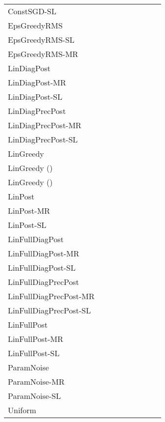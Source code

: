 \documentclass{article} \usepackage{iclr2018_conference,times}
\begin{document}
\begin{landscape}
\begin{table}[ht]
\begin{adjustbox}{center}
\begin{tabular}{lllllllll}
ConstSGD-SL & & & \bm{}& & & & &  \\
EpsGreedyRMS & & & & & & & &  \\
EpsGreedyRMS-SL & & & & & & & &  \\
EpsGreedyRMS-MR & & & & & & & &  \\
LinDiagPost & & & & & \bm{}& & &  \\
LinDiagPost-MR & & & & & & & &  \\
LinDiagPost-SL & & & & \bm{}& & & &  \\
LinDiagPrecPost & & & & & \bm{}& & &  \\
LinDiagPrecPost-MR & & & & & & & &  \\
LinDiagPrecPost-SL & & & & \bm{}& \bm{}& \bm{}& \bm{}& \bm{} \\
LinGreedy & & & & & & & \bm{}& \bm{} \\
LinGreedy () & & & & & & & \bm{}&  \\
LinGreedy () & & & & & & & &  \\
LinPost & & & & & \bm{}& & & \bm{} \\
LinPost-MR & & & & & & & &  \\
LinPost-SL & & & & & & \bm{}& \bm{}& \bm{} \\
LinFullDiagPost & & & & & & & &  \\
LinFullDiagPost-MR & & & & & & & &  \\
LinFullDiagPost-SL & & & & & & & &  \\
LinFullDiagPrecPost & & & & \bm{}& & & & \bm{} \\
LinFullDiagPrecPost-MR & & & & & & & \bm{}&  \\
LinFullDiagPrecPost-SL & & & & & & & \bm{}&  \\
LinFullPost & & & & & & & & \bm{} \\
LinFullPost-MR & & & & & & & & \bm{} \\
LinFullPost-SL & & & & & & & & \bm{} \\
ParamNoise & & & & & & & &  \\
ParamNoise-MR & & & & & & & &  \\
ParamNoise-SL & \bm{}& & & & & & &  \\
Uniform & & & & & & & &  \\
\bottomrule
\end{tabular}
 	\end{adjustbox}
	\vspace*{\fill}
\end{table}
\end{landscape}
\end{document}

